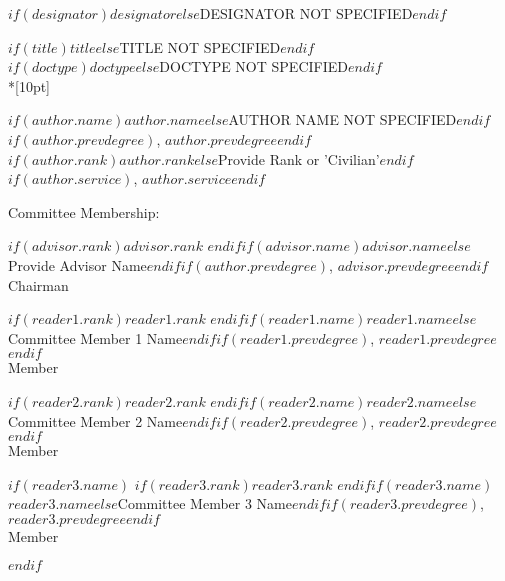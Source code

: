 \documentclass[12pt,letterpaper,toc=flat,oneside]{report}
\begin{document}
	\thispagestyle{empty}
	\setcounter{page}{3}
	\noindent $if(designator)$$designator$$else$DESIGNATOR NOT SPECIFIED$endif$
	\vfill
	\begin{center}
	    \MakeUppercase{$if(title)$$title$$else$TITLE NOT SPECIFIED$endif$}\\[10pt]
	    \MakeUppercase{$if(doctype)$$doctype$$else$DOCTYPE NOT SPECIFIED$endif$}\\*[10pt]
	    
	    \begingroup
  \singlespace
    $if(author.name)$$author.name$$else$AUTHOR NAME NOT SPECIFIED$endif$$if(author.prevdegree)$, $author.prevdegree$$endif$\\ 
    $if(author.rank)$$author.rank$$else$Provide Rank or 'Civilian'$endif$$if(author.service)$, \MakeUppercase{$author.service$}$endif$
    \par
  \endgroup
  
	\bigskip\medskip
	Committee Membership:
	\bigskip\medskip
	
	\begingroup
  \singlespace
    $if(advisor.rank)$$advisor.rank$ $endif$$if(advisor.name)$$advisor.name$$else$Provide Advisor Name$endif$$if(author.prevdegree)$, $advisor.prevdegree$$endif$\\ 
    Chairman
    \par
  \endgroup
  \bigskip\bigskip
  
  \begingroup
  \singlespace
    $if(reader1.rank)$$reader1.rank$ $endif$$if(reader1.name)$$reader1.name$$else$Committee Member 1 Name$endif$$if(reader1.prevdegree)$, $reader1.prevdegree$$endif$\\ 
    Member
    \par
  \endgroup
  \bigskip\bigskip
  
  \begingroup
  \singlespace
    $if(reader2.rank)$$reader2.rank$ $endif$$if(reader2.name)$$reader2.name$$else$Committee Member 2 Name$endif$$if(reader2.prevdegree)$, $reader2.prevdegree$$endif$\\ 
    Member
    \par
  \endgroup
  \bigskip\bigskip
  
  $if(reader3.name)$
  \begingroup
  \singlespace
    $if(reader3.rank)$$reader3.rank$ $endif$$if(reader3.name)$$reader3.name$$else$Committee Member 3 Name$endif$$if(reader3.prevdegree)$, $reader3.prevdegree$$endif$\\ 
    Member
    \par
  \endgroup
  \bigskip\bigskip
  $endif$
  

\end{center}
\end{document}
